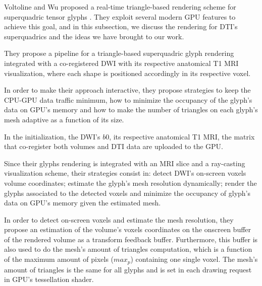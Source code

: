 \documentclass[twoside,twocolumn,10pt]{article}
\begin{document}
Voltoline and Wu \cite{voltoline2021} proposed a real-time triangle-based rendering scheme for superquadric tensor glyphs \cite{Kindlmann2004}. They exploit several modern GPU features to achieve this goal, and in this subsection, we discuss the rendering for DTI's superquadrics and the ideas we have brought to our work.









They propose a pipeline for a triangle-based superquadric glyph rendering integrated with a co-registered DWI with its respective anatomical T1 MRI visualization, where each shape is positioned accordingly in its respective voxel.

In order to make their approach interactive, they propose strategies to keep the CPU-GPU data traffic minimum, how to minimize the occupancy of the glyph's data on GPU's memory and how to make the number of triangles on each glyph's mesh adaptive as a function of its size.

In the initialization, the DWI's $b0$, its respective anatomical T1 MRI, the matrix that co-register both volumes and DTI data are uploaded to the GPU. 

Since their glyphs rendering is integrated with an MRI slice and a ray-casting visualization scheme, their strategies consist in: detect DWI's on-screen voxels volume coordinates; estimate the glyph's mesh resolution dynamically; render the glyphs associated to the detected voxels and minimize the occupancy of glyph's data on GPU's memory given the estimated mesh.

In order to detect on-screen voxels and estimate the mesh resolution, they propose an estimation of the volume's voxels coordinates on the onscreen buffer of the rendered volume as a transform feedback buffer. Furthermore, this buffer is also used to do the mesh's amount of triangles computation, which is a function of the maximum amount of pixels ($max_p$) containing one single voxel. The mesh's amount of triangles is the same for all glyphs and is set in each drawing request in GPU's tessellation shader.
\end{document}
